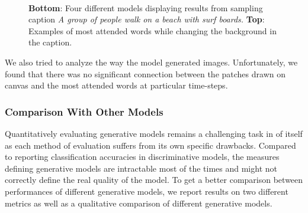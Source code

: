 \documentclass{article} %
\begin{document}
\begin{figure}[!t]
\begin{center}
\\
%
\quad
%
\quad
%
\quad
%
\quad
%
\end{center}
\caption{\textbf{Bottom}: Four different models displaying results from sampling caption \textit{A group of people walk on a beach with surf boards.} \textbf{Top}: Examples of most attended words while changing the background in the caption.}
\label{fig:diffmodels}
\end{figure}

We also tried to analyze the way the model generated images. Unfortunately, we found that there was no significant connection between the patches drawn on canvas and the most attended words at particular time-steps.

\subsubsection{Comparison With Other Models}
Quantitatively evaluating generative models remains a challenging task in of itself as each method of evaluation suffers from its own specific drawbacks. Compared to reporting classification accuracies in discriminative models, the measures defining generative models are intractable most of the times and might not correctly define the real quality of the model. To get a better comparison between performances of different generative models, we report results on two different metrics as well as a qualitative comparison of different generative models.
\end{document}
